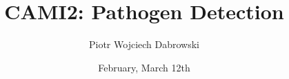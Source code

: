 \usepackage[utf8]{inputenc}
\usepackage[T1]{fontenc}
\usepackage[export]{adjustbox}
\usepackage{amssymb}
\usepackage{xcolor}

\title{CAMI2: Pathogen Detection}
\date{February, March 12th}
\author[PWD]{Piotr Wojciech Dabrowski}

\usepackage{HTWBeamerTemplate/beamerthemeHTW}
